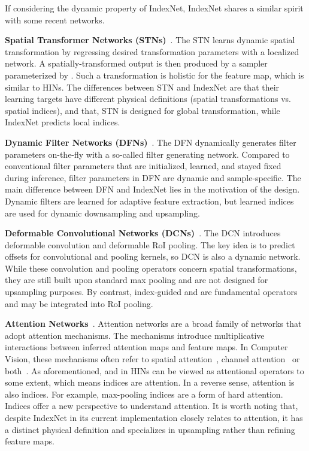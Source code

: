 \documentclass[10pt,twocolumn,letterpaper]{article}
\begin{document}
If considering the dynamic property of IndexNet, \mbox{IndexNet} shares a similar spirit with some recent networks.

\vspace{3pt}
\noindent\textbf{Spatial Transformer Networks (STNs)}~\cite{jaderberg2015spatial}. The STN learns dynamic spatial transformation by regressing desired transformation parameters  with a localized network. A spatially-transformed output is then produced by a sampler parameterized by . Such a transformation is holistic for the feature map, which is similar to HINs. The differences between STN and IndexNet are that their learning targets have different physical definitions (spatial transformations vs. spatial indices), and that, STN is designed for global transformation, while IndexNet predicts local indices.

\vspace{3pt}
\noindent\textbf{Dynamic Filter Networks (DFNs)}~\cite{jia2016dynamic}. The DFN dynamically generates filter parameters on-the-fly with a so-called filter generating network. Compared to conventional filter parameters that are initialized, learned, and stayed fixed during inference, filter parameters in DFN are dynamic and sample-specific. The main difference between DFN and IndexNet lies in the motivation of the design. Dynamic filters are learned for adaptive feature extraction, but learned indices are used for dynamic downsampling and upsampling.

\vspace{3pt}
\noindent\textbf{Deformable Convolutional Networks (DCNs)}~\cite{dai2017deformable}. The DCN introduces deformable convolution and deformable RoI pooling. The key idea is to predict offsets for convolutional and pooling kernels, so DCN is also a dynamic network. While these convolution and pooling operators concern spatial transformations, they are still built upon standard max pooling and are not designed for upsampling purposes. By contrast, index-guided  and  are fundamental operators and may be integrated into RoI pooling.

\vspace{3pt}
\noindent\textbf{Attention Networks}~\cite{mnih2014recurrent}. Attention networks are a broad family of networks that adopt attention mechanisms. The mechanisms introduce multiplicative interactions between inferred attention maps and feature maps. In Computer Vision, these mechanisms often refer to spatial attention~\cite{wang2017residual}, channel attention~\cite{hu2018squeeze} or both~\cite{woo2018cbam}. As aforementioned,  and  in HINs can be viewed as attentional operators to some extent, which means indices are attention. In a reverse sense, attention is also indices. For example, max-pooling indices are a form of hard attention. Indices offer a new perspective to understand attention. It is worth noting that, despite IndexNet in its current implementation closely relates to attention, it has a distinct physical definition and specializes in upsampling rather than refining feature maps.
\end{document}

